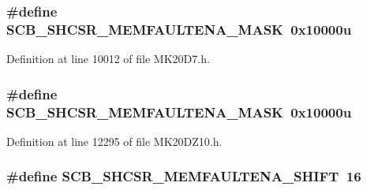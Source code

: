 \subsubsection[{\texorpdfstring{S\+C\+B\+\_\+\+S\+H\+C\+S\+R\+\_\+\+M\+E\+M\+F\+A\+U\+L\+T\+E\+N\+A\+\_\+\+M\+A\+SK}{SCB_SHCSR_MEMFAULTENA_MASK}}]{\setlength{\rightskip}{0pt plus 5cm}\#define S\+C\+B\+\_\+\+S\+H\+C\+S\+R\+\_\+\+M\+E\+M\+F\+A\+U\+L\+T\+E\+N\+A\+\_\+\+M\+A\+SK~0x10000u}\hypertarget{group___s_c_b___register___masks_gabd204d391ff2a884a4a98b759d3a4d79}{}\label{group___s_c_b___register___masks_gabd204d391ff2a884a4a98b759d3a4d79}


Definition at line 10012 of file M\+K20\+D7.\+h.

\subsubsection[{\texorpdfstring{S\+C\+B\+\_\+\+S\+H\+C\+S\+R\+\_\+\+M\+E\+M\+F\+A\+U\+L\+T\+E\+N\+A\+\_\+\+M\+A\+SK}{SCB_SHCSR_MEMFAULTENA_MASK}}]{\setlength{\rightskip}{0pt plus 5cm}\#define S\+C\+B\+\_\+\+S\+H\+C\+S\+R\+\_\+\+M\+E\+M\+F\+A\+U\+L\+T\+E\+N\+A\+\_\+\+M\+A\+SK~0x10000u}\hypertarget{group___s_c_b___register___masks_gabd204d391ff2a884a4a98b759d3a4d79}{}\label{group___s_c_b___register___masks_gabd204d391ff2a884a4a98b759d3a4d79}


Definition at line 12295 of file M\+K20\+D\+Z10.\+h.

\subsubsection[{\texorpdfstring{S\+C\+B\+\_\+\+S\+H\+C\+S\+R\+\_\+\+M\+E\+M\+F\+A\+U\+L\+T\+E\+N\+A\+\_\+\+S\+H\+I\+FT}{SCB_SHCSR_MEMFAULTENA_SHIFT}}]{\setlength{\rightskip}{0pt plus 5cm}\#define S\+C\+B\+\_\+\+S\+H\+C\+S\+R\+\_\+\+M\+E\+M\+F\+A\+U\+L\+T\+E\+N\+A\+\_\+\+S\+H\+I\+FT~16}\hypertarget{group___s_c_b___register___masks_gac72b28d7ffb8566d9afcdde86fa329af}{}\label{group___s_c_b___register___masks_gac72b28d7ffb8566d9afcdde86fa329af}


